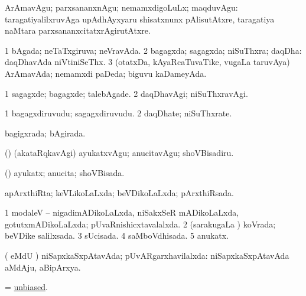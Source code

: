 \noindent
\gl{\akirx}
\expl{}
\bmng
ArAmavAgu; parxsananxnAgu; nemamxdigoLuLx; maqduvAgu:  taragatiyalilxruvAga upAdhAyxyaru shisatxnunx pAlisutAtxre, taragatiya naMtara parxsananxcitatxrAgirutAtxre. 
\emng
\eentry

\bentry
{} 
\gl{\gu}
\expl{}
\bmng
\bnum
\num{1} bAgada; neTaTxgiruva; neVravAda. 
\num{2} bagagxda; sagagxda; niSuThxra; daqDha:  daqDhavAda niVtiniSeThx. 
\num{3} (otatxDa, kAyaRcaTuvaTike, \mo vugaLa taruvAya) ArAmavAda; nemamxdi paDeda; biguvu kaDameyAda. 
\enum
\emng
\eentry

\bentry
{} 
\gl{\kirxvi}
\expl{}
\bmng
\bnum
\num{1} sagagxde; bagagxde; talebAgade. 
\num{2} daqDhavAgi; niSuThxravAgi. 
\enum
\emng
\eentry

\bentry
{} 
\gl{\nA}
\expl{}
\bmng
\bnum
\num{1} bagagxdiruvudu; sagagxdiruvudu. 
\num{2} daqDhate; niSuThxrate. 
\enum
\emng
\eentry

\bentry
{} 
\gl{\gu}
\expl{}
\bmng
bagigxrada; bAgirada. 
\emng
\eentry

\bentry
{} 
\gl{\sakirx}
\expl{}
\bmng
(\pArxparx) (akataRqkavAgi) ayukatxvAgu; anucitavAgu; shoVBisadiru. 
\emng
\eentry

\bentry
{} 
\gl{\gu}
\expl{}
\bmng
(\pArxparx) ayukatx; anucita; shoVBisada. 
\emng
\eentry

\bentry
{} 
\gl{\gu}
\expl{}
\bmng
apArxthiRta; keVLikoLaLxda; beVDikoLaLxda; pArxthiRsada. 
\emng
\eentry

\bentry
{} 
\gl{\gu}
\expl{}
\bmng
\bnum
\num{1} modaleV -- nigadimADikoLaLxda, niSakxSeR mADikoLaLxda, gotutxmADikoLaLxda; pUvaRnishicxtavalalxda. 
\num{2} (sarakugaLa \vi) koVrada; beVDike salilxsada. 
\num{3} sUcisada. 
\num{4} saMboVdhisada. 
\num{5} anukatx. 
\enum
\emng
\eentry


\bentry
{} 
\gl{\gu}
\expl{}
\bmng
( eMdU \parx) niSapxkaSxpAtavAda; pUvARgarxhavilalxda:  niSapxkaSxpAtavAda aMdAju, aBipArxya. 
\emng
\eentry

\bentry
{} 
\gl{\gu}
\expl{}
\bmng
= \hyperlink{unbiased}{unbiased}. 
\emng
\eentry

